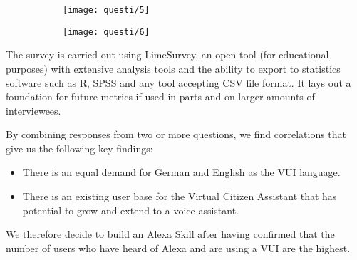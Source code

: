 \begin{figure}[h!]
	\caption[Survey Results (cont'd)]{ \textsc{Activities on Alexa and a Voice Assistant for the city's authorities} - Results of conducted survey for 34 participants for the development of an Alexa Skill}




\begin{subfigure}[b]{\linewidth}
	\texttt{[image: questi/5]}
\end{subfigure}



\begin{subfigure}[b]{\linewidth}
	\texttt{[image: questi/6]}
\end{subfigure}


\end{figure}





The survey is carried out using LimeSurvey, an open tool (for educational purposes) with extensive analysis tools and the ability to export to statistics software such as R, SPSS and any tool accepting CSV file format. It lays out a foundation for future metrics if used in parts and on larger amounts of interviewees.

By combining responses from two or more questions, we find correlations that give us the following key findings: 

\begin{itemize}
	
	\item There is an equal demand for German and English as the VUI language.
	
	\item There is an existing user base for the Virtual Citizen Assistant that has potential to grow and extend to a voice assistant.
\end{itemize}
%


We therefore decide to build an Alexa Skill after having confirmed that the number of users who have heard of Alexa and are using a VUI are the highest.


